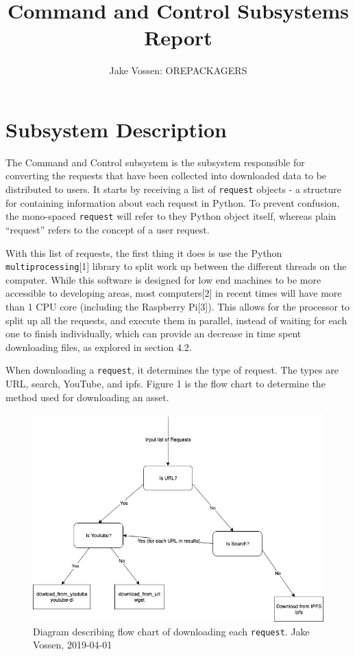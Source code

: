 \documentclass{article}
\begin{document}
\title{Command and Control Subsystems Report}
\author{Jake Vossen: OREPACKAGERS}

\maketitle


\section{Subsystem Description}
The Command and Control subsystem is the subsystem responsible for
converting the requests that have been collected into downloaded data
to be distributed to users. It starts by receiving a list of
\texttt{request} objects - a structure for containing information about
each request in Python. To prevent confusion, the mono-spaced \texttt{request}
will refer to they Python object itself, whereas plain ``request''
refers to the concept of a user request.

With this list of requests, the first thing it does is use the Python
\texttt{multiprocessing}[1] library to split work up between the
different threads on the computer. While this software is designed
for low end machines to be more accessible to developing areas, most
computers[2] in recent times will have more than 1 CPU core (including
the Raspberry Pi[3]). This allows for the processor to split up all
the requests, and execute them in parallel, instead of waiting for each
one to finish individually, which can provide an decrease in time
spent downloading files, as explored in section 4.2.

When downloading a \texttt{request}, it determines the type of
request. The types are URL, search, YouTube, and ipfs. Figure 1 is the
flow chart to determine the method used for downloading an asset.

\begin{figure}[H]
  \centering
  \includegraphics[scale=.5]{log-flow-chart.png}
  \caption{\begingroup \fontsize{10pt}{10pt}\selectfont Diagram describing flow chart of downloading each
    \texttt{request}. Jake Vossen, 2019-04-01 \endgroup}
\end{figure}
\end{document}
